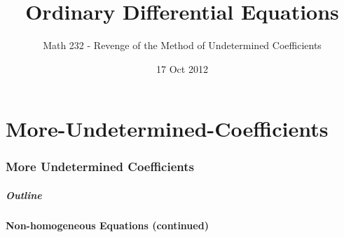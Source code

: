 \part{More-Undetermined-Coefficients}
\section{More Undetermined Coefficients}

\title{Ordinary Differential Equations}
\subtitle{Math 232 - Revenge of the Method of Undetermined Coefficients}
\date{17 Oct 2012}

\begin{frame}
  \titlepage
\end{frame}

\begin{frame}
  \frametitle{Outline}
\end{frame}


\subsection{Non-homogeneous Equations (continued)}


